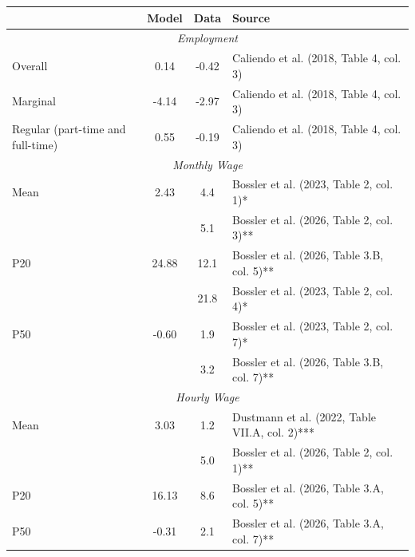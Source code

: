  \begin{tabular}{lccl} \hline 
       & Model  &  Data  & Source   \\ 
 \hline 
 \multicolumn{4}{c}{\textit{Employment}}   \\ 
 Overall   &  0.14  & -0.42  & Caliendo et al. (2018, Table 4, col. 3)  \\ 
 Marginal  &  -4.14  & -2.97  & Caliendo et al. (2018, Table 4, col. 3)  \\ 
 Regular (part-time and full-time)  &  0.55  & -0.19  &  Caliendo et al. (2018, Table 4, col. 3) \\ 
 \multicolumn{4}{c}{\textit{Monthly Wage}}   \\ 
 Mean  &  2.43  & 4.4  & Bossler et al. (2023, Table 2, col. 1)*  \\ 
       &        & 5.1  & Bossler et al. (2026, Table 2, col. 3)**  \\ 
 P20   &  24.88  & 12.1  &  Bossler et al. (2026, Table 3.B, col. 5)** \\ 
       &        & 21.8  &  Bossler et al. (2023, Table 2, col. 4)* \\ 
 P50   &  -0.60  & 1.9 &  Bossler et al. (2023, Table 2, col. 7)* \\ 
       &        & 3.2  &  Bossler et al. (2026, Table 3.B, col. 7)** \\ 
 \multicolumn{4}{c}{\textit{Hourly Wage}}   \\ 
 Mean  &  3.03  & 1.2 &  Dustmann et al. (2022, Table VII.A, col. 2)*** \\ 
       &        & 5.0  & Bossler et al. (2026, Table 2, col. 1)**  \\ 
 P20   &  16.13  & 8.6  &  Bossler et al. (2026, Table 3.A, col. 5)** \\ 
 P50   &  -0.31  & 2.1  &  Bossler et al. (2026, Table 3.A, col. 7)** \\ 
\hline 
 \end{tabular} 
